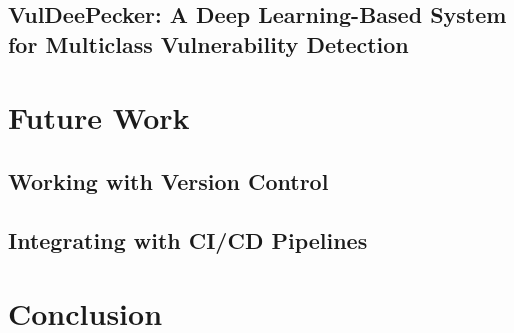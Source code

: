 \documentclass[12pt,twocolumn,letterpaper]{article}
\begin{document}
\subsection{VulDeePecker: A Deep Learning-Based System for Multiclass Vulnerability Detection}
\label{sub:vuledeepecker}

\cite{Zou21}

\section{Future Work}
\label{sec:future-work}

\subsection{Working with Version Control}
\label{sub:working-with-version-control}

\subsection{Integrating with CI/CD Pipelines}
\label{sub:integrating-with-cicd-pipelines}

\section{Conclusion}
\label{sec:conclusion}

{\small


}
\end{document}
